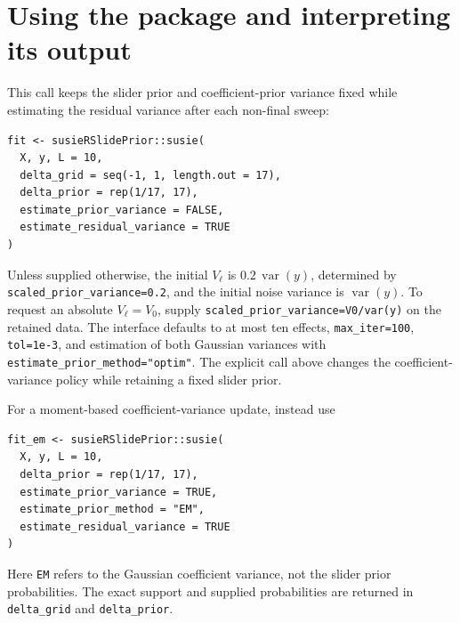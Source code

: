 \documentclass[11pt]{article}
\begin{document}
\section{Using the package and interpreting its output}
\label{sec:api}
This call keeps the slider prior and coefficient-prior variance fixed
while estimating the residual variance after each non-final sweep:
\begin{verbatim}
fit <- susieRSlidePrior::susie(
  X, y, L = 10,
  delta_grid = seq(-1, 1, length.out = 17),
  delta_prior = rep(1/17, 17),
  estimate_prior_variance = FALSE,
  estimate_residual_variance = TRUE
)
\end{verbatim}
Unless supplied otherwise, the initial $V_\ell$ is
$0.2\,\operatorname{var}(y)$, determined by
\texttt{scaled\_prior\_variance=0.2}, and the initial noise variance is
$\operatorname{var}(y)$. To request an absolute $V_\ell=V_0$, supply
\texttt{scaled\_prior\_variance=V0/var(y)} on the retained data.
The interface defaults to at most ten effects, \texttt{max\_iter=100},
\texttt{tol=1e-3}, and estimation of both Gaussian variances with
\texttt{estimate\_prior\_method="optim"}. The explicit call above changes
the coefficient-variance policy while retaining a fixed slider prior.

For a moment-based coefficient-variance update, instead use
\begin{verbatim}
fit_em <- susieRSlidePrior::susie(
  X, y, L = 10,
  delta_prior = rep(1/17, 17),
  estimate_prior_variance = TRUE,
  estimate_prior_method = "EM",
  estimate_residual_variance = TRUE
)
\end{verbatim}
Here \texttt{EM} refers to the Gaussian coefficient variance, not the slider
prior probabilities. The exact support and supplied probabilities are
returned in \texttt{delta\_grid} and \texttt{delta\_prior}.
\end{document}
